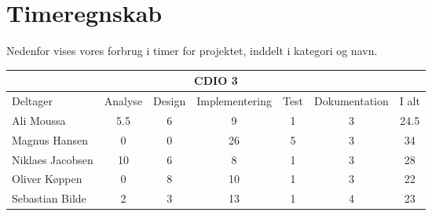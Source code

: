 \chapter*{Timeregnskab}

Nedenfor vises vores forbrug i timer for projektet, inddelt i kategori og navn.

\begin{table}[h]
    \centering
        \begin{tabular}{|l|c|c|c|c|c|c|}
                \hline
            \multicolumn{7}{|c|}{CDIO 3}
            \\ \hline
                    Deltager         &  Analyse  &  Design  &  Implementering  &  Test  &  Dokumentation  &  I alt
            \\ \hline
                    Ali Moussa       &    5.5      &    6     &        9         &    1   &        3        &    24.5
            \\ \hline
                    Magnus Hansen    &    0      &    0     &        26         &    5   &        3        &    34
            \\ \hline
                    Niklaes Jacobsen &    10      &    6     &        8         &    1   &        3        &    28
            \\ \hline
                    Oliver Køppen    &    0      &    8     &        10        &    1   &        3        &    22
            \\ \hline
                    Sebastian Bilde  &    2      &    3     &        13         &    1   &        4        &   23
            \\ \hline
        \end{tabular}
\end{table}